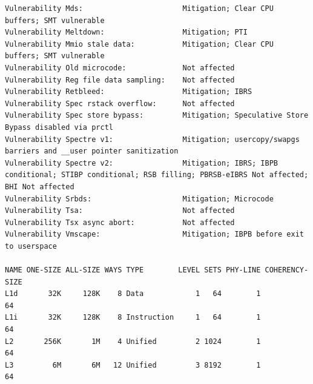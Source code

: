 \begin{lstlisting}[caption={Ausagbe von lscpu und lscpu --caches des
Intel\textregistered\space Core\texttrademark\space i7-7700HQ}]
Vulnerability Mds:                       Mitigation; Clear CPU buffers; SMT vulnerable
Vulnerability Meltdown:                  Mitigation; PTI
Vulnerability Mmio stale data:           Mitigation; Clear CPU buffers; SMT vulnerable
Vulnerability Old microcode:             Not affected
Vulnerability Reg file data sampling:    Not affected
Vulnerability Retbleed:                  Mitigation; IBRS
Vulnerability Spec rstack overflow:      Not affected
Vulnerability Spec store bypass:         Mitigation; Speculative Store Bypass disabled via prctl
Vulnerability Spectre v1:                Mitigation; usercopy/swapgs barriers and __user pointer sanitization
Vulnerability Spectre v2:                Mitigation; IBRS; IBPB conditional; STIBP conditional; RSB filling; PBRSB-eIBRS Not affected; BHI Not affected
Vulnerability Srbds:                     Mitigation; Microcode
Vulnerability Tsa:                       Not affected
Vulnerability Tsx async abort:           Not affected
Vulnerability Vmscape:                   Mitigation; IBPB before exit to userspace

NAME ONE-SIZE ALL-SIZE WAYS TYPE        LEVEL SETS PHY-LINE COHERENCY-SIZE
L1d       32K     128K    8 Data            1   64        1             64
L1i       32K     128K    8 Instruction     1   64        1             64
L2       256K       1M    4 Unified         2 1024        1             64
L3         6M       6M   12 Unified         3 8192        1             64
\end{lstlisting}


